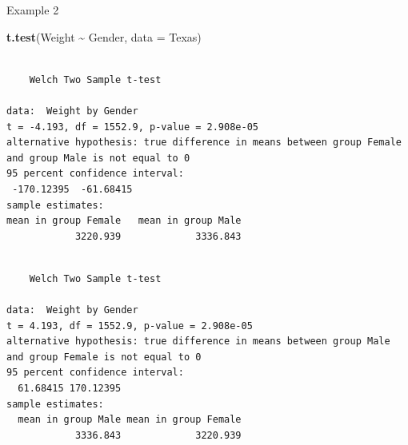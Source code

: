 \documentclass[
  ignorenonframetext,
]{beamer}
\newenvironment{Shaded}{\begin{snugshade}}{\end{snugshade}}
\newcommand{\AttributeTok}[1]{\textcolor[rgb]{0.13,0.29,0.53}{#1}}
\newcommand{\FunctionTok}[1]{\textcolor[rgb]{0.13,0.29,0.53}{\textbf{#1}}}
\newcommand{\NormalTok}[1]{#1}
\newcommand{\OtherTok}[1]{\textcolor[rgb]{0.56,0.35,0.01}{#1}}
\newcommand{\SpecialCharTok}[1]{\textcolor[rgb]{0.81,0.36,0.00}{\textbf{#1}}}
\newcommand{\StringTok}[1]{\textcolor[rgb]{0.31,0.60,0.02}{#1}}
\begin{document}
\begin{frame}[fragile]{Example 2}
\protect\hypertarget{example-2-3}{}
\tiny

\begin{Shaded}
\begin{Highlighting}[]
\FunctionTok{t.test}\NormalTok{(Weight }\SpecialCharTok{\textasciitilde{}}\NormalTok{ Gender, }\AttributeTok{data =}\NormalTok{ Texas)}
\end{Highlighting}
\end{Shaded}

\begin{verbatim}

    Welch Two Sample t-test

data:  Weight by Gender
t = -4.193, df = 1552.9, p-value = 2.908e-05
alternative hypothesis: true difference in means between group Female and group Male is not equal to 0
95 percent confidence interval:
 -170.12395  -61.68415
sample estimates:
mean in group Female   mean in group Male 
            3220.939             3336.843 
\end{verbatim}

\begin{Shaded}
\end{Shaded}

\begin{verbatim}

    Welch Two Sample t-test

data:  Weight by Gender
t = 4.193, df = 1552.9, p-value = 2.908e-05
alternative hypothesis: true difference in means between group Male and group Female is not equal to 0
95 percent confidence interval:
  61.68415 170.12395
sample estimates:
  mean in group Male mean in group Female 
            3336.843             3220.939 
\end{verbatim}

\normalsize
\end{frame}
\end{document}
